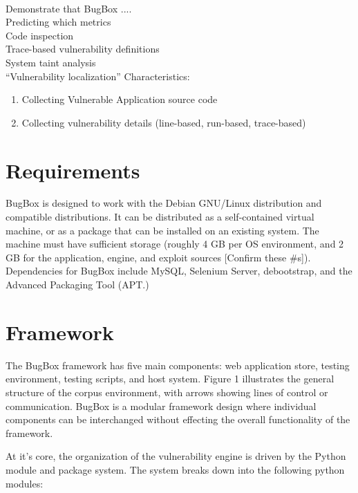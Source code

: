 \documentclass[letterpaper,twocolumn,10pt]{article}
\begin{document}
 \\
Demonstrate that BugBox ....\\
Predicting which metrics  \\

\noindent Code inspection\\
Trace-based vulnerability definitions\\
System taint analysis\\

\noindent ``Vulnerability localization'' Characteristics:
 \begin{enumerate} 
	\item Collecting Vulnerable Application source code
	\item Collecting vulnerability details (line-based, run-based, trace-based)
 \end{enumerate}

\section{Requirements}

BugBox is designed to work with the Debian GNU/Linux distribution and compatible distributions.  It can be distributed as a self-contained virtual machine, or as a package that can be installed on an existing system. The machine must have sufficient storage (roughly 4 GB per OS environment, and 2 GB for the application, engine, and exploit sources [Confirm these \#s]).  Dependencies for BugBox include MySQL,  Selenium Server, debootstrap, and the Advanced Packaging Tool (APT.)\par

\section{Framework}

The BugBox framework has five main components: web application store, testing environment, testing scripts, and host system. Figure 1 illustrates the general structure of the corpus environment, with arrows showing lines of control or communication.  BugBox is a modular framework design where individual components can be interchanged without effecting the overall functionality of the framework.\par
At it's core, the organization of the vulnerability engine is driven by the Python module and package system. The system breaks down into the following python modules:
\end{document}
